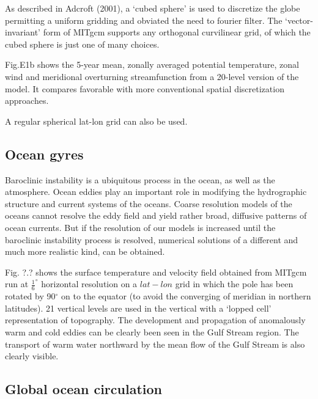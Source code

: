 \documentclass[12pt]{book}
\begin{document}

As described in Adcroft (2001), a `cubed sphere' is used to discretize the
globe permitting a uniform gridding and obviated the need to fourier filter.
The `vector-invariant' form of MITgcm supports any orthogonal curvilinear
grid, of which the cubed sphere is just one of many choices.

Fig.E1b shows the 5-year mean, zonally averaged potential temperature, zonal
wind and meridional overturning streamfunction from a 20-level version of
the model. It compares favorable with more conventional spatial
discretization approaches.

A regular spherical lat-lon grid can also be used.


\subsection{Ocean gyres}

Baroclinic instability is a ubiquitous process in the ocean, as well as the
atmosphere. Ocean eddies play an important role in modifying the
hydrographic structure and current systems of the oceans. Coarse resolution
models of the oceans cannot resolve the eddy field and yield rather broad,
diffusive patterns of ocean currents. But if the resolution of our models is
increased until the baroclinic instability process is resolved, numerical
solutions of a different and much more realistic kind, can be obtained.

Fig. ?.? shows the surface temperature and velocity field obtained from
MITgcm run at $\frac{1}{6}^{\circ }$ horizontal resolution on a $lat-lon$
grid in which the pole has been rotated by 90$^{\circ }$ on to the equator
(to avoid the converging of meridian in northern latitudes). 21 vertical
levels are used in the vertical with a `lopped cell' representation of
topography. The development and propagation of anomalously warm and cold
eddies can be clearly been seen in the Gulf Stream region. The transport of
warm water northward by the mean flow of the Gulf Stream is also clearly
visible.



\subsection{Global ocean circulation}
\end{document}
